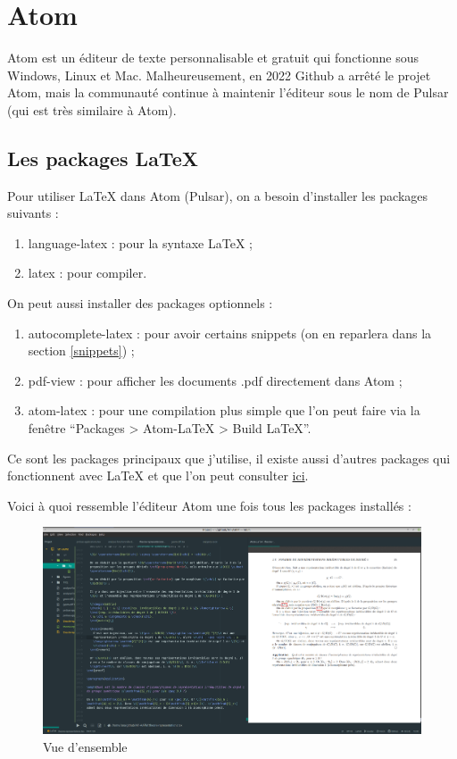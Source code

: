 \documentclass[french]{article}
\theoremstyle{definition}
\theoremstyle{remark}
\begin{document}
\section{Atom}

Atom est un éditeur de texte personnalisable et gratuit qui fonctionne sous Windows, Linux et Mac. Malheureusement, en 2022 Github a arrêté le projet Atom, mais la communauté continue à maintenir l'éditeur sous le nom de Pulsar (qui est très similaire à Atom).

\subsection{Les packages LaTeX}

Pour utiliser LaTeX dans Atom (Pulsar), on a besoin d'installer les packages suivants :

\begin{enumerate}
  \item language-latex : pour la syntaxe LaTeX ;
  \item latex : pour compiler.
\end{enumerate}

On peut aussi installer des packages optionnels :

\begin{enumerate}
  \item autocomplete-latex : pour avoir certains snippets (on en reparlera dans la section \ref{snippets}) ;
  \item pdf-view : pour afficher les documents .pdf directement dans Atom ;
  \item atom-latex : pour une compilation plus simple que l'on peut faire via la fenêtre ``Packages > Atom-LaTeX > Build LaTeX''.
\end{enumerate}

Ce sont les packages principaux que j'utilise, il existe aussi d'autres packages qui fonctionnent avec LaTeX et que l'on peut consulter \href{https://gist.github.com/Aerijo/5b9522530715e5be6e89fc012e9a72a8}{ici}.

Voici à quoi ressemble l'éditeur Atom une fois tous les packages installés :

\begin{figure}[h!]
  \centering
  \includegraphics[scale=0.2]{fig/general.png}
  \caption{Vue d'ensemble}
  \label{}
\end{figure}
\end{document}
